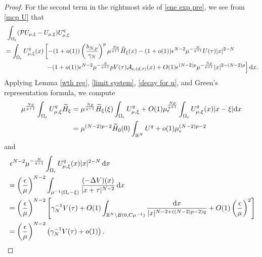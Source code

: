 \documentclass[reqno]{amsart}
\theoremstyle{remark}
\newcommand{\ep}{\epsilon}
\newcommand{\ga}{\gamma}
\newcommand{\R}{\mathbb{R}}
\newcommand{\mca}{\mathcal{A}}
\newcommand{\mcp}{\mathcal{P}}
\newcommand{\wth}{\widetilde{H}}
\newcommand{\dx}{\textup{d}x}
\newcommand{\mx}{{\mu,\xi}}
\renewcommand{\(}{\left(}
\renewcommand{\)}{\right)}
\numberwithin{equation}{section}
\begin{document}
\begin{proof}
For the second term in the rightmost side of \eqref{ene exp pre}, we see from \eqref{mcp U} that
\begin{equation}\label{second term est}
\begin{aligned}
&\ \int_{\Omega_\ep} (\mcp U_\mx-U_\mx)U_\mx^q \\
&=\int_{\Omega_\ep} U_\mx^q(x) \left[-(1+o(1))\(\frac{b_{N,p}}{\ga_N}\)^p\mu^{\frac{Np}{q+1}}\wth_\xi(x) - (1+o(1))\ep^{N-2}\mu^{-\frac{N}{q+1}}U(\tau) {|x|^{2-N}} \right. \\
&\hspace{65pt} \left. -(1+o(1))\ep^{N-2}\mu^{-\frac{N}{q+1}} pV(\tau)\mca_{\ep,(d,\tau)}(x) + O(1)\ep^{(N-2)p}\mu^{-\frac{Np}{p+1}} |x|^{2-(N-2)p} \right] \dx.
\end{aligned}
\end{equation}
Applying Lemma \ref{wth reg}, \eqref{limit system}, \eqref{decay for u}, and Green's representation formula, we compute
\begin{equation}\label{second term est1}
\begin{aligned}
\mu^{\frac{Np}{q+1}} \int_{\Omega_\ep} U_\mx^q \wth_\xi
&=\mu^{\frac{Np}{q+1}}\wth_\xi(\xi)\int_{\Omega_\ep} U_\mx^q + O(1)\mu_\ep^{\frac{Np}{q+1}} \int_{\Omega_\ep} U_\mx^q(x)|x-\xi|\dx\\
&=\mu^{(N-2)p-2}\wth_0(0)\int_{\R^N}U^q + o(1)\mu_\ep^{(N-2)p-2}
\end{aligned}
\end{equation}
and
\begin{equation}\label{second term est3}
\begin{aligned}
&\ \ep^{N-2}\mu^{-\frac{N}{q+1}} \int_{\Omega_\ep} U_\mx^q(x)|x|^{2-N}\, \dx \\
&=\(\frac{\ep}{\mu}\)^{N-2} \int_{\mu^{-1}(\Omega_\ep-\xi)}\frac{(-\Delta V)(x)}{|x+\tau|^{N-2}}\, \dx \\
&=\(\frac{\ep}{\mu}\)^{N-2} \left[\ga_N^{-1}V(\tau) + O(1)\int_{\R^N \setminus B(0,C\mu^{-1})} \frac{\dx}{|x|^{N-2+((N-2)p-2)q}} + O(1) \(\frac{\ep}{\mu}\)^2\right] \\
&= \(\frac{\ep}{\mu}\)^{N-2}\(\ga_N^{-1}V(\tau)+o(1)\).
\end{aligned}
\end{equation}

\end{proof}
\end{document}

